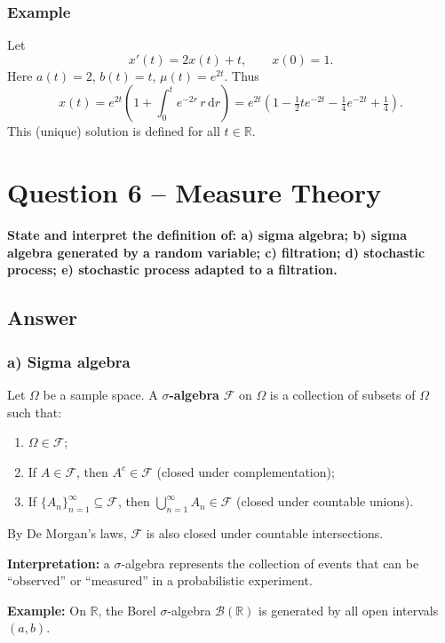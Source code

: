 \documentclass[12pt,a4paper]{book}
\theoremstyle{remark}
\newcommand{\RR}{\mathbb{R}}
\newcommand{\F}{\mathcal{F}}          %
\newcommand{\dd}{\mathrm{d}}
\begin{document}
\subsubsection*{Example}
Let
\[
x'(t)=2x(t)+t,\qquad x(0)=1.
\]
Here $a(t)=2$, $b(t)=t$, $\mu(t)=e^{2t}$. Thus
\[
x(t)=e^{2t}\left(1+\int_0^t e^{-2r}\,r\,\dd r\right)
= e^{2t}\left(1-\tfrac12 t e^{-2t}-\tfrac14 e^{-2t}+\tfrac14\right).
\]
This (unique) solution is defined for all $t\in\RR$.













\newpage
\section{Question 6 -- Measure Theory}
\textbf{State and interpret the definition of:  
a) sigma algebra;  
b) sigma algebra generated by a random variable;  
c) filtration;  
d) stochastic process;  
e) stochastic process adapted to a filtration.}

\subsection*{Answer}

\subsubsection*{a) Sigma algebra}
Let $\Omega$ be a sample space. A \textbf{$\sigma$-algebra} $\F$ on $\Omega$ is a collection of subsets of $\Omega$ such that:
\begin{enumerate}[label=\roman*)]
    \item $\Omega \in \F$;
    \item If $A \in \F$, then $A^c \in \F$ (closed under complementation);
    \item If $\{A_n\}_{n=1}^\infty \subseteq \F$, then $\bigcup_{n=1}^\infty A_n \in \F$ (closed under countable unions).
\end{enumerate}
By De Morgan’s laws, $\F$ is also closed under countable intersections.  

\textbf{Interpretation:} a $\sigma$-algebra represents the collection of events that can be “observed” or “measured” in a probabilistic experiment.  

\textbf{Example:} On $\RR$, the Borel $\sigma$-algebra $\mathcal{B}(\RR)$ is generated by all open intervals $(a,b)$.
\end{document}
